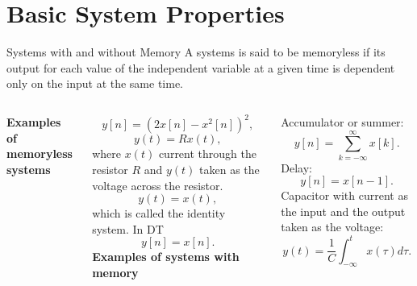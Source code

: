 \section{Basic System Properties}

\begin{frame}{Systems with and without Memory}
    A systems is said to be \alert{memoryless}  if its output for each value of the independent variable at a given time is dependent only on the input at the same time.
    \vspace{0.1in}
    \par
    \begin{columns}
            \textbf{Examples of memoryless systems}\par
            \begin{equation*}
                y[n] = (2x[n] - x^2[n])^2,
            \end{equation*}
            \begin{equation*}
                y(t) = Rx(t),
            \end{equation*}
            where $x(t)$ current through the resistor $R$ and $y(t)$ taken as the voltage across the resistor.
            \begin{equation*}
                y(t) = x(t),
            \end{equation*}
            which is called the \alert{identity system}. In DT
            \begin{equation*}
                y[n] = x[n].
            \end{equation*}
            \textbf{Examples of systems with memory}\par
            Accumulator or summer:
            \begin{equation*}
                y[n] = \sum_{k=-\infty}^{\infty}x[k].
            \end{equation*}
            Delay:
            \begin{equation*}
                y[n] = x[n-1].
            \end{equation*}
            Capacitor with current as the input and the output taken as the voltage:
            \begin{equation*}
                y(t) = \frac{1}{C}\int_{-\infty}^{t}x(\tau)d\tau.
            \end{equation*}
    \end{columns}
    \pause
    {
    }
\end{frame}


